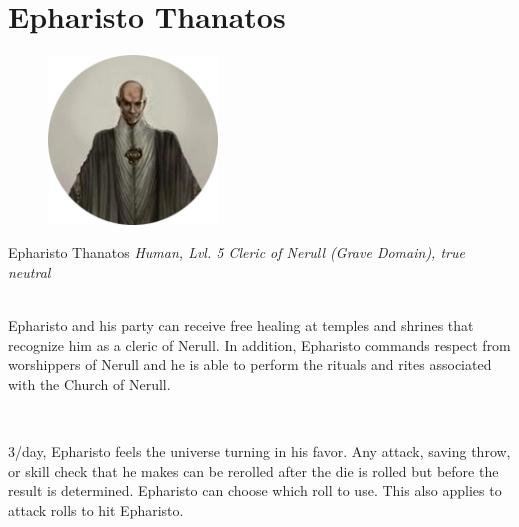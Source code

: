 \documentclass[10pt,twoside,twocolumn,openany]{book}
\begin{document}
\selectfont %


\chapter{Epharisto Thanatos}
\begin{figure}
  \includegraphics[width = 0.4\textwidth]{ET.png}
\end{figure}

\begin{monsterbox}{Epharisto Thanatos}
	\textit{Human, Lvl. 5 Cleric of Nerull (Grave Domain), true neutral}\\
	\hline
	\basics[%
	armorclass = 18,
	hitpoints  = 38 (5d8 + 10),
	speed      = 30 ft
	]
	\hline
	\stats[
    STR = \stat{9}, %
    DEX = \stat{14},
    CON = \stat{14},
    INT = \stat{12},
    WIS = \stat{18},
    CHA = \stat{12}
  ]
	\hline
	\details[%
  savingthrows = {WIS $+7$, CHA $+4$},
  skills = {Passive Perception $17$, Passive Investigation $11$},
	languages = {Common, 3 others},
	]
	\hline \\[1mm]
	\begin{monsteraction}
		Epharisto and his party can receive free healing at temples and shrines that recognize him as a cleric of Nerull. In addition, Epharisto commands respect from worshippers of Nerull and he is able to perform the rituals and rites associated with the Church of Nerull.
	\end{monsteraction}\\
  \begin{monsteraction}[Lucky]
    3/day, Epharisto feels the universe turning in his favor.
    Any attack, saving throw, or skill check that he makes can be rerolled after the die is rolled but before the result is determined.
    Epharisto can choose which roll to use.
    This also applies to attack rolls to hit Epharisto.
  \end{monsteraction}

\end{monsterbox}
\end{document}
